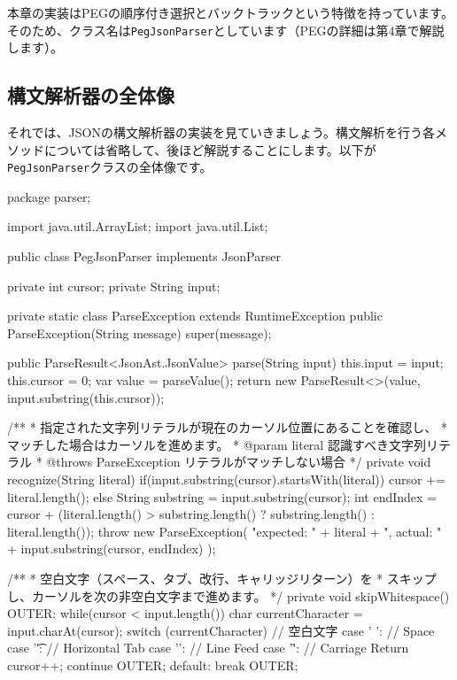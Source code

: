 本章の実装はPEGの順序付き選択とバックトラックという特徴を持っています。そのため、クラス名は\texttt{PegJsonParser}としています（PEGの詳細は第4章で解説します）。

\subsection{構文解析器の全体像}

それでは、JSONの構文解析器の実装を見ていきましょう。構文解析を行う各メソッドについては省略して、後ほど解説することにします。以下が\texttt{PegJsonParser}クラスの全体像です。

\begin{codescreen}{}
package parser;

import java.util.ArrayList;
import java.util.List;

public class PegJsonParser implements JsonParser {
    private int cursor;
    private String input;

    private static class ParseException extends RuntimeException {
        public ParseException(String message) {
            super(message);
        }
    }

    public ParseResult<JsonAst.JsonValue> parse(String input) {
        this.input = input;
        this.cursor = 0;
        var value = parseValue();
        return new ParseResult<>(value, input.substring(this.cursor));
    }

    /**
     * 指定された文字列リテラルが現在のカーソル位置にあることを確認し、
     * マッチした場合はカーソルを進めます。
     * @param literal 認識すべき文字列リテラル
     * @throws ParseException リテラルがマッチしない場合
     */
    private void recognize(String literal) {
        if(input.substring(cursor).startsWith(literal)) {
            cursor += literal.length();
        } else {
            String substring = input.substring(cursor);
            int endIndex = cursor + 
              (literal.length() > substring.length() ? 
                substring.length() : literal.length());
            throw new ParseException(
                "expected: " + literal + 
                ", actual: " + input.substring(cursor, endIndex)
            );
        }
    }


    /**
     * 空白文字（スペース、タブ、改行、キャリッジリターン）を
     * スキップし、カーソルを次の非空白文字まで進めます。
     */
    private void skipWhitespace() {
        OUTER:
        while(cursor < input.length()) {
            char currentCharacter = input.charAt(cursor);
            switch (currentCharacter) {
                // 空白文字
                case ' ':       // Space
                case '\t':      // Horizontal Tab
                case '\n':      // Line Feed
                case '\r':      // Carriage Return
                    cursor++;
                    continue OUTER;
                default:
                    break OUTER;
            }
        }
    }

}
\end{codescreen}
